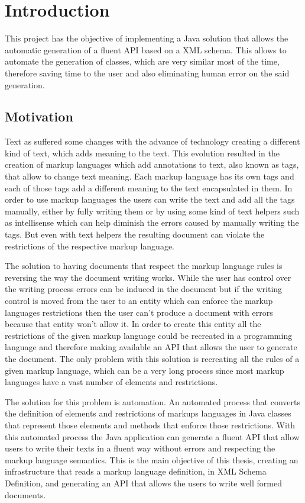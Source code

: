 % 
%  
%
\chapter{Introduction}

This project has the objective of implementing a Java solution that allows the automatic generation of a fluent API based on a XML schema. This allows to automate the generation of classes, which are very similar most of the time, therefore saving time to the user and also eliminating human error on the said generation.

\section{Motivation}

Text as suffered some changes with the advance of technology creating a different kind of text, which adds meaning to the text. This evolution resulted in the creation of markup languages which add annotations to text, also known as tags, that allow to change text meaning. Each markup language has its own tags and each of those tags add a different meaning to the text encapsulated in them. In order to use markup languages the users can write the text and add all the tags manually, either by fully writing them or by using some kind of text helpers such as intellisense which can help diminish the errors caused by manually writing the tags. But even with text helpers the resulting document can violate the restrictions of the respective markup language. 

\noindent
The solution to having documents that respect the markup language rules is reversing the way the document writing works. While the user has control over the writing process errors can be induced in the document but if the writing control is moved from the user to an entity which can enforce the markup languages restrictions then the user can't produce a document with errors because that entity won't allow it. In order to create this entity all the restrictions of the given markup language could be recreated in a programming language and therefore making available an API that allows the user to generate the document. The only problem with this solution is recreating all the rules of a given markup language, which can be a very long process since most markup languages have a vast number of elements and restrictions. 

\noindent
The solution for this problem is automation. An automated process that converts the definition of elements and restrictions of markups languages in Java classes that represent those elements and methods that enforce those restrictions. With this automated process the Java application can generate a fluent API that allow users to write their texts in a fluent way without errors and respecting the markup language semantics. This is the main objective of this thesis, creating an infrastructure that reads a markup language definition, in XML Schema Definition, and generating an API that allows the users to write well formed documents.

